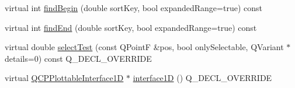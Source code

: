 \begin{DoxyCompactItemize}
\item 
virtual int \hyperlink{class_q_c_p_error_bars_aad74fa52d2471f23677faff1d8697cee}{find\+Begin} (double sort\+Key, bool expanded\+Range=true) const
\item 
virtual int \hyperlink{class_q_c_p_error_bars_a5a529f3a9e71b6c29f8a0397d570489e}{find\+End} (double sort\+Key, bool expanded\+Range=true) const
\item 
virtual double \hyperlink{class_q_c_p_error_bars_a78990786eb7632c9ba07105888eb6b1c}{select\+Test} (const Q\+PointF \&pos, bool only\+Selectable, Q\+Variant $\ast$details=0) const Q\+\_\+\+D\+E\+C\+L\+\_\+\+O\+V\+E\+R\+R\+I\+DE
\item 
virtual \hyperlink{class_q_c_p_plottable_interface1_d}{Q\+C\+P\+Plottable\+Interface1D} $\ast$ \hyperlink{class_q_c_p_error_bars_a0b6fbf3a943b4241ee485d066cc8562a}{interface1D} () Q\+\_\+\+D\+E\+C\+L\+\_\+\+O\+V\+E\+R\+R\+I\+DE
\end{DoxyCompactItemize}
